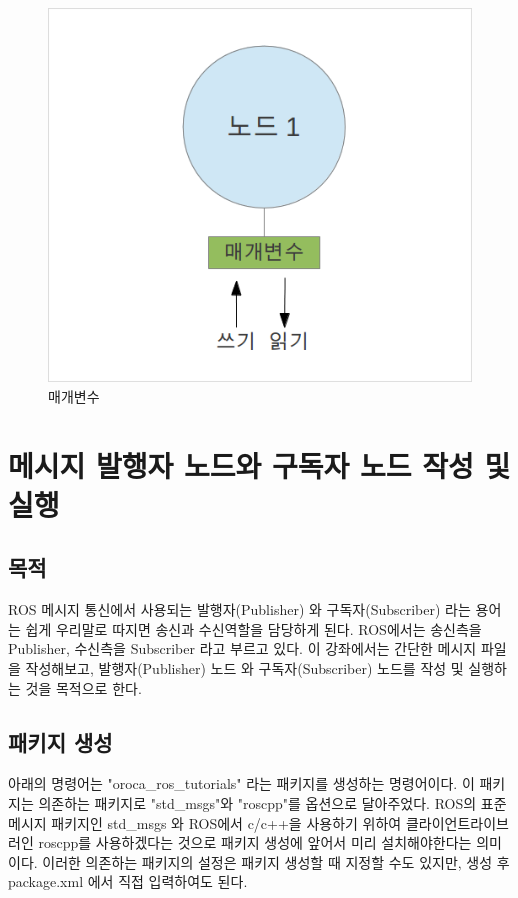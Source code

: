 \begin{figure}[h]
\centering\includegraphics[width=0.6\columnwidth]{pictures/chapter7/msgtrans4.png}
\caption{매개변수}
\end{figure}

\section{메시지 발행자 노드와 구독자 노드 작성 및 실행}

\subsection{목적}

ROS 메시지 통신에서 사용되는 발행자(Publisher) 와 구독자(Subscriber) 라는 용어는 쉽게 우리말로 따지면 송신과 수신역할을 담당하게 된다. ROS에서는 송신측을 Publisher, 수신측을 Subscriber 라고 부르고 있다. 이 강좌에서는 간단한 메시지 파일을 작성해보고, 발행자(Publisher) 노드 와 구독자(Subscriber) 노드를 작성 및 실행하는 것을 목적으로 한다.

\subsection{패키지 생성}

아래의 명령어는 "oroca\_ros\_tutorials" 라는 패키지를 생성하는 명령어이다. 이 패키지는 의존하는 패키지로 "std\_msgs"와 "roscpp"를 옵션으로 달아주었다. ROS의 표준 메시지 패키지인 std\_msgs 와 ROS에서 c/c++을 사용하기 위하여 클라이언트라이브러인 roscpp를 사용하겠다는 것으로 패키지 생성에 앞어서 미리 설치해야한다는 의미이다. 이러한 의존하는 패키지의 설정은 패키지 생성할 때 지정할 수도 있지만, 생성 후 package.xml 에서 직접 입력하여도 된다.

